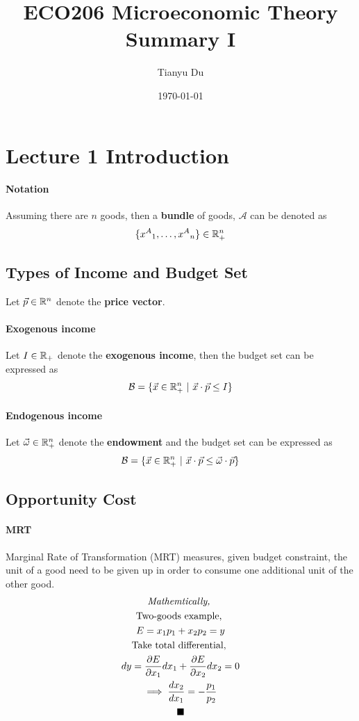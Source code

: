 \documentclass{article}
\title{ECO206 Microeconomic Theory Summary I}
\author{Tianyu Du}
\date{\today}
\begin{document}
	\maketitle
	\tableofcontents
	
	\section{Lecture 1 Introduction}
		\paragraph{Notation} Assuming there are $n$ goods, then a \textbf{bundle} of goods, $\mathcal{A}$ can be denoted as
		\[
			\{{{x^A}_{1}}, \dots, {{x^A}_{n}}\} \in \mathbb{R}^n_{+}
		\]
		
		\subsection{Types of Income and Budget Set}
			Let $\vec{p} \in \mathbb{R}^n$ denote the \textbf{price vector}.
			\paragraph{Exogenous income} Let $I \in \mathbb{R}_+$ denote the \textbf{exogenous income}, then the budget set can be expressed as
			\[
				\mathcal{B} = \{\vec{x} \in \R^n_+ \ | \ \vec{x} \cdot \vec{p} \leq I \}
			\]
			
			\paragraph{Endogenous income} Let $\vec{\omega} \in \mathbb{R}^n_+$ denote the \textbf{endowment} and the budget set can be expressed as
			\[
				\mathcal{B} = \{\vec{x} \in \R^n_+ \ | \ \vec{x} \cdot \vec{p} \leq \vec{\omega} \cdot \vec{p}\}
			\]
		
		\subsection{Opportunity Cost}
			\paragraph{MRT} Marginal Rate of Transformation (MRT) measures, given budget constraint, the unit of a good need to be given up in order to consume one additional unit of the other good. 
			\begin{multline*}
				\emph{Mathemtically, }\\
				\text{{Two-goods example, }} \\
				E = x_1 p_1 + x_2 p_2 = y \\
				\text{{Take total differential, }}\\
				dy = \frac{\partial{E}}{\partial{x_1}} dx_1 + \frac{\partial{E}}{\partial{x_2}} dx_2 = 0\\
				\implies \frac{d{x_2}}{d{x_1}} = -\frac{p_1}{p_2} \\
				\blacksquare
			\end{multline*}
\end{document}
